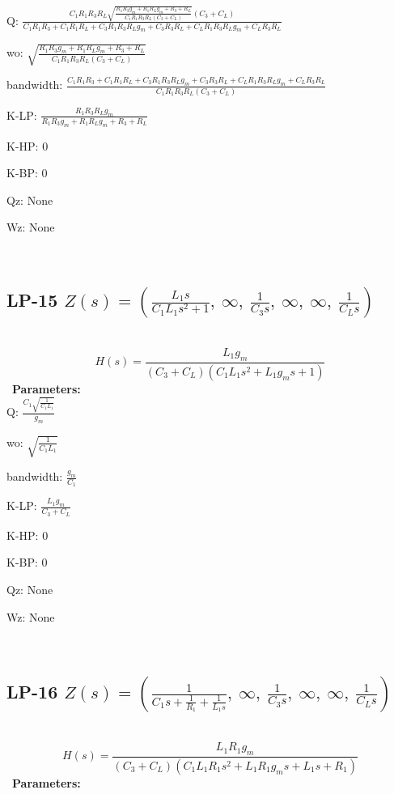 \documentclass{article}
\begin{document}
Q: $\frac{C_{1} R_{1} R_{3} R_{L} \sqrt{\frac{R_{1} R_{3} g_{m} + R_{1} R_{L} g_{m} + R_{3} + R_{L}}{C_{1} R_{1} R_{3} R_{L} \left(C_{3} + C_{L}\right)}} \left(C_{3} + C_{L}\right)}{C_{1} R_{1} R_{3} + C_{1} R_{1} R_{L} + C_{3} R_{1} R_{3} R_{L} g_{m} + C_{3} R_{3} R_{L} + C_{L} R_{1} R_{3} R_{L} g_{m} + C_{L} R_{3} R_{L}}$\ 

wo: $\sqrt{\frac{R_{1} R_{3} g_{m} + R_{1} R_{L} g_{m} + R_{3} + R_{L}}{C_{1} R_{1} R_{3} R_{L} \left(C_{3} + C_{L}\right)}}$\ 

bandwidth: $\frac{C_{1} R_{1} R_{3} + C_{1} R_{1} R_{L} + C_{3} R_{1} R_{3} R_{L} g_{m} + C_{3} R_{3} R_{L} + C_{L} R_{1} R_{3} R_{L} g_{m} + C_{L} R_{3} R_{L}}{C_{1} R_{1} R_{3} R_{L} \left(C_{3} + C_{L}\right)}$\ 

K-LP: $\frac{R_{1} R_{3} R_{L} g_{m}}{R_{1} R_{3} g_{m} + R_{1} R_{L} g_{m} + R_{3} + R_{L}}$\ 

K-HP: $0$\ 

K-BP: $0$\ 

Qz: $\text{None}$\ 

Wz: $\text{None}$\ 

\ 

\subsection{LP-15 $Z(s) = \left( \frac{L_{1} s}{C_{1} L_{1} s^{2} + 1}, \  \infty, \  \frac{1}{C_{3} s}, \  \infty, \  \infty, \  \frac{1}{C_{L} s}\right)$ } \ 
\textbf{\[H(s) = \frac{L_{1} g_{m}}{\left(C_{3} + C_{L}\right) \left(C_{1} L_{1} s^{2} + L_{1} g_{m} s + 1\right)}\] } \ 
\textbf{Parameters:}\\ 

Q: $\frac{C_{1} \sqrt{\frac{1}{C_{1} L_{1}}}}{g_{m}}$\ 

wo: $\sqrt{\frac{1}{C_{1} L_{1}}}$\ 

bandwidth: $\frac{g_{m}}{C_{1}}$\ 

K-LP: $\frac{L_{1} g_{m}}{C_{3} + C_{L}}$\ 

K-HP: $0$\ 

K-BP: $0$\ 

Qz: $\text{None}$\ 

Wz: $\text{None}$\ 

\ 

\subsection{LP-16 $Z(s) = \left( \frac{1}{C_{1} s + \frac{1}{R_{1}} + \frac{1}{L_{1} s}}, \  \infty, \  \frac{1}{C_{3} s}, \  \infty, \  \infty, \  \frac{1}{C_{L} s}\right)$ } \ 
\textbf{\[H(s) = \frac{L_{1} R_{1} g_{m}}{\left(C_{3} + C_{L}\right) \left(C_{1} L_{1} R_{1} s^{2} + L_{1} R_{1} g_{m} s + L_{1} s + R_{1}\right)}\] } \ 
\textbf{Parameters:}\\ 
\end{document}
